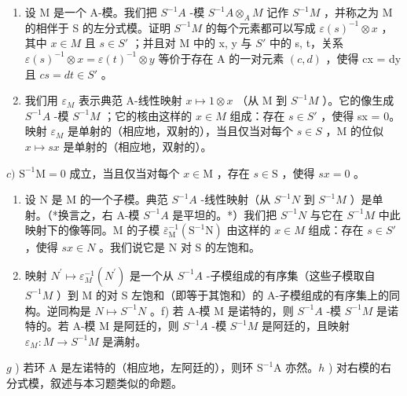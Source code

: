 \begin{enumerate}
\def\labelenumi{\alph{enumi})}
\item
  设 M 是一个 A-模。我们把 \(S^{-1}A\) -模 \(S^{-1}A \otimes_{A} M\) 记作 \(S^{-1}M\) ，并称之为 M 的相伴于 S 的左分式模。证明 \(S^{-1}M\) 的每个元素都可以写成 \(\varepsilon(s)^{-1} \otimes x\) ，其中 \(x \in M\) 且 \(s \in S'\) ；并且对 M 中的 x, y 与 \(S'\) 中的 s, t，关系 \(\varepsilon(s)^{-1} \otimes x = \varepsilon(t)^{-1} \otimes y\) 等价于存在 A 的一对元素 \((c, d)\) ，使得 cx = dy 且 \(cs = dt \in S'\) 。
\item
  我们用 \(\varepsilon_{M}\) 表示典范 A-线性映射 \(x \mapsto 1 \otimes x\) （从 M 到 \(S^{-1}M\) ）。它的像生成 \(S^{-1}A\) -模 \(S^{-1}M\) ；它的核由这样的 \(x \in M\) 组成：存在 \(s \in S'\) ，使得 sx = 0。映射 \(\varepsilon_{M}\) 是单射的（相应地，双射的），当且仅当对每个 \(s \in S\) ，M 的位似 \(x \mapsto sx\) 是单射的（相应地，双射的）。
\end{enumerate}

\(c)\) \(\mathrm{S}^{-1}\mathrm{M} = 0\) 成立，当且仅当对每个 \(x\in \mathrm{M}\) ，存在 \(s\in \mathrm{S}\) ，使得 \(sx = 0\) 。

\begin{enumerate}
\def\labelenumi{\alph{enumi})}
\setcounter{enumi}{3}
\item
  设 N 是 M 的一个子模。典范 \(S^{-1}A\) -线性映射（从 \(S^{-1}N\) 到 \(S^{-1}M\) ）是单射。（*换言之，右 A-模 \(S^{-1}A\) 是平坦的。*）我们把 \(S^{-1}N\) 与它在 \(S^{-1}M\) 中此映射下的像等同。M 的子模 \(\bar{\varepsilon}_{\mathrm{M}}^{-1}(\mathrm{S}^{-1}\mathrm{N})\) 由这样的 \(x \in M\) 组成：存在 \(s \in S'\) ，使得 \(sx \in N\) 。我们说它是 N 对 S 的左饱和。
\item
  映射 \(N^{\prime} \mapsto \varepsilon_{M}^{-1}(N^{\prime})\) 是一个从 \(S^{-1}A\) -子模组成的有序集（这些子模取自 \(S^{-1}M\) ）到 M 的对 S 左饱和（即等于其饱和）的 A-子模组成的有序集上的同构。逆同构是 \(N \mapsto S^{-1}N\) 。f) 若 A-模 M 是诺特的，则 \(S^{-1}A\) -模 \(S^{-1}M\) 是诺特的。若 A-模 M 是阿廷的，则 \(S^{-1}A\) -模 \(S^{-1}M\) 是阿廷的，且映射 \(\varepsilon_{M}: M \to S^{-1}M\) 是满射。
\end{enumerate}

\(g\) ) 若环 A 是左诺特的（相应地，左阿廷的），则环 \(\mathrm{S}^{-1}\mathrm{A}\) 亦然。\(h\) ) 对右模的右分式模，叙述与本习题类似的命题。


